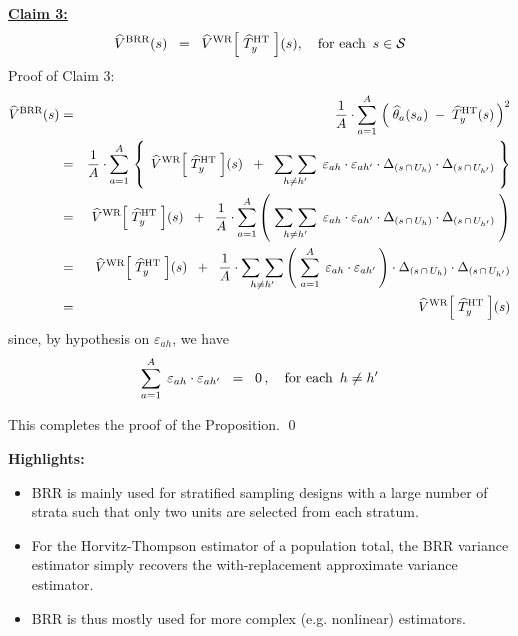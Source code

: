 \begin{enumerate}
	\vskip 0.8cm
	\noindent
	\underline{\textbf{Claim 3:}}
	\begin{equation*}
	\widehat{V}^{\textnormal{BRR}}(s)
	\;\; = \;\;
		\widehat{V}^{\textnormal{WR}}\!\left[\;\widehat{T}^{\textnormal{HT}}_{y}\;\right]\!(s),
	\quad
	\textnormal{for each \,$s \in \mathcal{S}$}
	\end{equation*}
	Proof of Claim 3:
	\begin{eqnarray*}
	\widehat{V}^{\textnormal{BRR}}(s)
	& = &
		\dfrac{1}{A} \cdot \overset{A}{\underset{a=1}{\sum}}\,
		\left(\;\widehat{\theta}_{a}(s_{a}) \;-\; \widehat{T}^{\textnormal{HT}}_{y}(s)\,\right)^{2}
	\\
	& = &
		\dfrac{1}{A} \cdot \overset{A}{\underset{a=1}{\sum}}\,
		\left\{\;\,
			\widehat{V}^{\textnormal{WR}}\!\left[\;\widehat{T}^{\textnormal{HT}}_{y}\;\right]\!(s)
			\;\; + \;\;
			\underset{h \neq h^{\prime}}{\sum\,\sum}\;\,
				\varepsilon_{ah} \cdot \varepsilon_{ah^{\prime}} 
				\cdot \Delta_{(s\,\cap\,U_{h})}
				\cdot \Delta_{(s\,\cap\,U_{h^{\prime}})}
			\;\right\}
	\\
	& = &
		\widehat{V}^{\textnormal{WR}}\!\left[\;\widehat{T}^{\textnormal{HT}}_{y}\;\right]\!(s)
		\;\; + \;\;
		\dfrac{1}{A} \cdot
		\overset{A}{\underset{a=1}{\sum}}
		\left(\;
			\underset{h \neq h^{\prime}}{\sum\,\sum}\;\,
			\varepsilon_{ah} \cdot \varepsilon_{ah^{\prime}} 
			\cdot \Delta_{(s\,\cap\,U_{h})}
			\cdot \Delta_{(s\,\cap\,U_{h^{\prime}})}
			\;\right)
	\\
	& = &
		\widehat{V}^{\textnormal{WR}}\!\left[\;\widehat{T}^{\textnormal{HT}}_{y}\;\right]\!(s)
		\;\; + \;\;
		\dfrac{1}{A} \cdot
		\underset{h \neq h^{\prime}}{\sum\,\sum}
		\left(\;
			\overset{A}{\underset{a=1}{\sum}}\;\,
			\varepsilon_{ah} \cdot \varepsilon_{ah^{\prime}} 
			\,\right)
		\cdot \Delta_{(s\,\cap\,U_{h})}
		\cdot \Delta_{(s\,\cap\,U_{h^{\prime}})}
	\\
	& = &
		\widehat{V}^{\textnormal{WR}}\!\left[\;\widehat{T}^{\textnormal{HT}}_{y}\;\right]\!(s)
	\end{eqnarray*}
	since, by hypothesis on $\varepsilon_{ah}$, we have
	\begin{equation*}
	\overset{A}{\underset{a=1}{\sum}}\;\,
	\varepsilon_{ah} \cdot \varepsilon_{ah^{\prime}}
	\;\; = \;\; 0\,,
	\quad
	\textnormal{for each \,$h \neq h^{\prime}$}
	\end{equation*}
\end{enumerate}
This completes the proof of the Proposition.
\qed

\vskip 0.5cm
\textbf{Highlights:}
\begin{itemize}
\item
	BRR is mainly used for stratified sampling designs
	with a large number of strata such that only
	two units are selected from each stratum.
\item
	For the Horvitz-Thompson estimator of a population total,
	the BRR variance estimator simply recovers the
	with-replacement approximate variance estimator.
\item
	BRR is thus mostly used for more complex (e.g. nonlinear) estimators.
\end{itemize}

